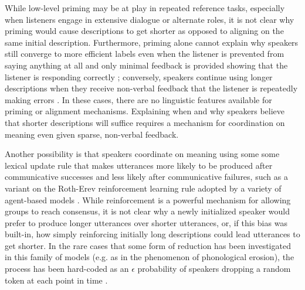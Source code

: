 While low-level priming may be at play in repeated reference tasks, especially when listeners engage in extensive dialogue or alternate roles, it is not clear why priming would cause descriptions to get shorter as opposed to aligning on the same initial description.
Furthermore, priming alone cannot explain why speakers still converge to more efficient labels even when the listener is prevented from saying anything at all and only minimal feedback is provided showing that the listener is responding correctly \cite{KraussWeinheimer66_Tangrams}; conversely, speakers continue using longer descriptions when they receive non-verbal feedback that the listener is repeatedly making errors \cite<see also>{hawkins2020characterizing}.
In these cases, there are no linguistic features available for priming or alignment mechanisms.
Explaining when and why speakers believe that shorter descriptions will suffice requires a mechanism for coordination on meaning even given sparse, non-verbal feedback.

Another possibility is that speakers coordinate on meaning using some some lexical update rule that makes utterances more likely to be produced after communicative successes and less likely after communicative failures, such as a variant on the Roth-Erev reinforcement learning rule \cite{erev1998predicting} adopted by a variety of agent-based models \cite{steels_self-organizing_1995,barr_establishing_2004,young_evolution_2015}.
While reinforcement is a powerful mechanism for allowing groups to reach consensus, it is not clear why a newly initialized speaker would prefer to produce longer utterances over shorter utterances, or, if this bias was built-in, how simply reinforcing initially long descriptions could lead utterances to get shorter. 
In the rare cases that some form of reduction has been investigated in this family of models (e.g. as in the phenomenon of phonological erosion), the process has been hard-coded as an $\epsilon$ probability of speakers dropping a random token at each point in time \cite{beuls2013agent,steels2016agent}.

